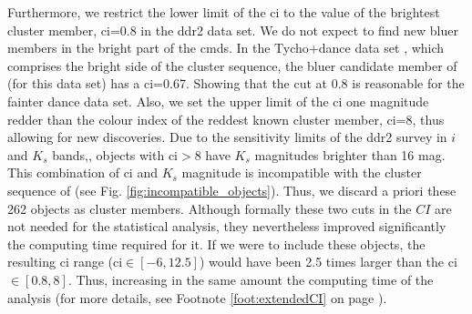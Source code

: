 Furthermore, we restrict the lower limit of the \gls{ci} to the value of the brightest cluster member, \gls{ci}=0.8 in the \gls{ddr2} data set. We do not expect to find new bluer members in the bright part of the \glspl{cmd}. In the Tycho+\gls{dance} data set \citep{Bouy2015}, which comprises the bright side of the cluster sequence, the bluer candidate member of \citet{Bouy2015} (for this data set) has a \gls{ci}=0.67. Showing that the cut at 0.8 is reasonable for the fainter \gls{dance} data set. Also, we set the upper limit of the \gls{ci} one magnitude redder than the colour index of the reddest known cluster member, \gls{ci}=8, thus allowing for new discoveries. Due to the sensitivity limits of the \gls{ddr2} survey in $i$ and $K_s$ bands,\cite[$i\sim23$ mag and $K_s\sim18$ mag, see Appendix A of][]{Bouy2015}, objects with \gls{ci}$>8$ have $K_s$ magnitudes brighter than 16 mag. This combination of \gls{ci} and $K_s$ magnitude is incompatible with the cluster sequence of \citet{Bouy2015} (see Fig. \ref{fig:incompatible_objects}). Thus, we discard a priori these 262 objects as cluster members. Although formally these two cuts in the $CI$ are not needed for the statistical analysis, they nevertheless improved significantly the computing time required for it. If we were to include these objects, the resulting \gls{ci} range (\gls{ci}$\in[-6,12.5]$) would have been 2.5 times larger than the \gls{ci}$\in[0.8,8]$. Thus, increasing in the same amount the computing time of the analysis (for more details, see Footnote \ref{foot:extendedCI} on page \pageref{foot:extendedCI}).

